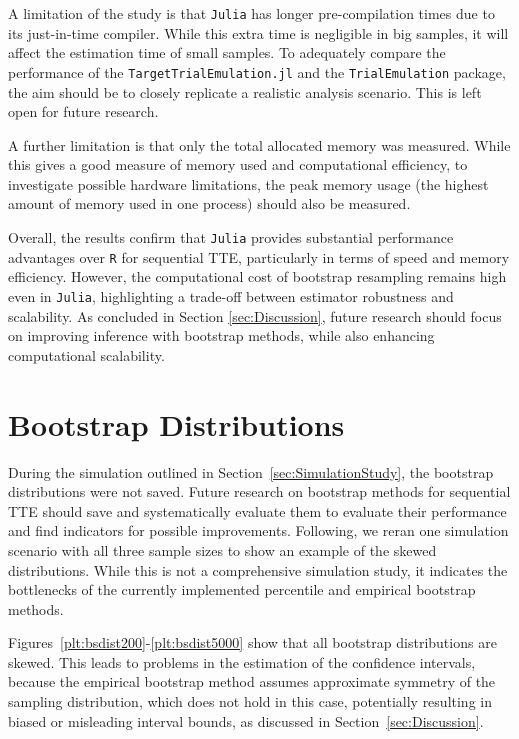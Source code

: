 \documentclass[pdflatex,sn-vancouver-ay]{sn-jnl}%
\theoremstyle{thmstyleone}%
\theoremstyle{thmstyletwo}%
\theoremstyle{thmstylethree}%
\newcommand{\Rlang}{\texttt{R}}
\newcommand{\julia}{\texttt{Julia}}
\newcommand{\RTTE}{\texttt{TrialEmulation}}
\newcommand{\juliaTTE}{\texttt{TargetTrialEmulation.jl}}
\begin{document}
\begin{appendices}
A limitation of the study is that \julia{} has longer pre-compilation times due to its just-in-time compiler. While this extra time is negligible in big samples, it will affect the estimation time of small samples. To adequately compare the performance of the \juliaTTE{} and the \RTTE{} package, the aim should be to closely replicate a realistic analysis scenario. This is left open for future research.

A further limitation is that only the total allocated memory was measured. While this gives a good measure of memory used and computational efficiency, to investigate possible hardware limitations, the peak memory usage (the highest amount of memory used in one process) should also be measured.

Overall, the results confirm that \julia{} provides substantial performance advantages over \Rlang{} for sequential TTE, particularly in terms of speed and memory efficiency. However, the computational cost of bootstrap resampling remains high even in \julia{}, highlighting a trade-off between estimator robustness and scalability. As concluded in Section \ref{sec:Discussion}, future research should focus on improving inference with bootstrap methods, while also enhancing computational scalability.



\pagebreak

\section{Bootstrap Distributions}\label{Apx:BS}
During the simulation outlined in Section~\ref{sec:SimulationStudy}, the bootstrap distributions were not saved. Future research on bootstrap methods for sequential TTE should save and systematically evaluate them to evaluate their performance and find indicators for possible improvements. Following, we reran one simulation scenario with all three sample sizes to show an example of the skewed distributions. While this is not a comprehensive simulation study, it indicates the bottlenecks of the currently implemented percentile and empirical bootstrap methods. 

Figures~\ref{plt:bsdist200}-\ref{plt:bsdist5000} show that all bootstrap distributions are skewed. This leads to problems in the estimation of the confidence intervals, because the empirical bootstrap method assumes approximate symmetry of the sampling distribution, which does not hold in this case, potentially resulting in biased or misleading interval bounds, as discussed in Section~\ref{sec:Discussion}.


\end{appendices}
\end{document}
